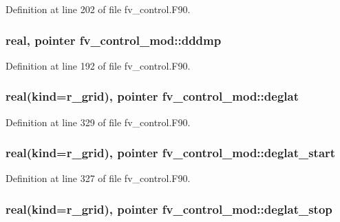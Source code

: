 Definition at line 202 of file fv\-\_\-control.\-F90.

\subsubsection[{dddmp}]{\setlength{\rightskip}{0pt plus 5cm}real, pointer fv\-\_\-control\-\_\-mod\-::dddmp\hspace{0.3cm}{\ttfamily [private]}}\label{classfv__control__mod_a24119b4a68eeaddf30c32d7c9f3cad41}


Definition at line 192 of file fv\-\_\-control.\-F90.

\subsubsection[{deglat}]{\setlength{\rightskip}{0pt plus 5cm}real(kind=r\-\_\-grid), pointer fv\-\_\-control\-\_\-mod\-::deglat\hspace{0.3cm}{\ttfamily [private]}}\label{classfv__control__mod_ac023f3c9fe559dbcf7206c9e95365adf}


Definition at line 329 of file fv\-\_\-control.\-F90.

\subsubsection[{deglat\-\_\-start}]{\setlength{\rightskip}{0pt plus 5cm}real(kind=r\-\_\-grid), pointer fv\-\_\-control\-\_\-mod\-::deglat\-\_\-start\hspace{0.3cm}{\ttfamily [private]}}\label{classfv__control__mod_a3115a067b4b068522b933e2cc3e561e9}


Definition at line 327 of file fv\-\_\-control.\-F90.

\subsubsection[{deglat\-\_\-stop}]{\setlength{\rightskip}{0pt plus 5cm}real(kind=r\-\_\-grid), pointer fv\-\_\-control\-\_\-mod\-::deglat\-\_\-stop\hspace{0.3cm}{\ttfamily [private]}}\label{classfv__control__mod_ab6ff7a8ad9c9efb237e38ee764aeebed}


